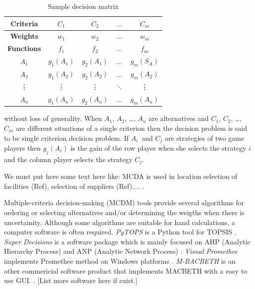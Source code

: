 \documentclass[authoryear,preprint,review,12pt]{elsarticle}
\begin{document}
\begin{table}[H]
	\centering
	\begin{tabular}{|c|c|c|c|c|}
		\hline
		\textbf{Criteria} & {$C_1$} & {$C_2$} & $\dots$ & {$C_m$} \\
		\hline
		\textbf{Weights} & {$w_1$} & {$w_2$} & $\dots$ & {$w_m$} \\
		\hline
		\textbf{Functions} & {$f_1$} & {$f_2$} & $\dots$ & {$f_m$} \\
		\hline
		\hline
		{$A_1$} & {$g_1(A_1)$} & {$g_2(A_1)$} & $\dots$ & {$g_m(S_A)$} \\
		\hline
		{$A_2$} & {$g_1(A_2)$} & {$g_2(A_2)$} & $\dots$ & {$g_m(A_2)$} \\
		\hline
		\vdots & \vdots & \vdots & $\ddots$ & \vdots  \\
		\hline		
		$A_n$ & $g_1(A_n) $ &  $g_2(A_n) $ & $\dots$ &  $g_m(A_n) $ \\
		\hline   
	\end{tabular}
	\caption{Sample decision matrix}
	\label{table:sample_decision_matrix} 
\end{table}

\noindent without loss of generality. When $A_1$, $A_2$, \dots, $A_n$ are alternatives and $C_1$, $C_2$, \dots, $C_m$ are different situations of a single criterion then the decision problem is said to be single criterion decision problem. If $A_i$ and $C_j$ are strategies of two game players then $g_j(A_i)$ is the gain of the row player when she selects the strategy $i$ and the column player selects the strategy $C_j$. 

{\color{red}We must put here some text here like:
MCDA is used in location selection of facilities (Ref), selection of suppliers (Ref)....
.}

Multiple-criteria decision-making (MCDM) tools provide several algorithms for ordering or  selecting alternatives and/or determining the weigths when there is uncertainity. Although some algorithms are suitable for hand calculations, a computer software is often required. \emph{PyTOPS} is a Python tool for TOPSIS \cite{Yadav_2019}. \emph{Super Decisions} is a software package which is mainly focused on AHP (Analytic Hierarchy Process) and ANP (Analytic Network Process) \cite{adams2003super}. \emph{Visual Promethee} implements Promethee method on Windows platforms \cite{Mareschal_2009}. \emph{M-BACBETH} is an other commericial software product that implements MACBETH with a easy to use GUI.  \cite{macbeth}. {\color{red} [List more software here if exist.]}
\end{document}
